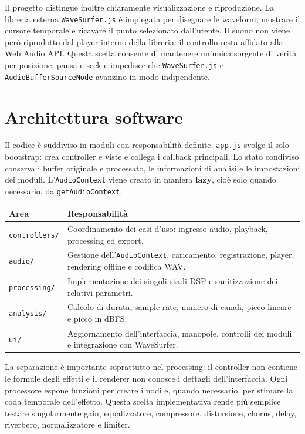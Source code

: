 \documentclass[11pt,a4paper]{article}
\begin{document}
	Il progetto distingue inoltre chiaramente visualizzazione e riproduzione. La libreria esterna \texttt{WaveSurfer.js} è impiegata per disegnare le waveform, mostrare il cursore temporale e ricavare il punto selezionato dall'utente. Il suono non viene però riprodotto dal player interno della libreria: il controllo resta affidato alla Web Audio API. Questa scelta consente di mantenere un'unica sorgente di verità per posizione, pausa e seek e impedisce che \texttt{WaveSurfer.js} e \texttt{AudioBufferSourceNode} avanzino in modo indipendente.
	
	\section{Architettura software}
	
	Il codice è suddiviso in moduli con responsabilità definite. \texttt{app.js} svolge il solo bootstrap: crea controller e viste e collega i callback principali. Lo stato condiviso conserva i buffer originale e processato, le informazioni di analisi e le impostazioni dei moduli.
	L'\texttt{AudioContext} viene creato in maniera \textbf{lazy}, cioè solo quando necessario, da \texttt{getAudioContext}.
	\begin{table}[h]
		\centering
		\small
		\begin{tabularx}{\textwidth}{@{}lX@{}}
			\toprule
			\textbf{Area} & \textbf{Responsabilità} \\
			\midrule
			\texttt{controllers/} & Coordinamento dei casi d'uso: ingresso audio, playback, processing ed export. \\
			\texttt{audio/} & Gestione dell'\texttt{AudioContext}, caricamento, registrazione, player, rendering offline e codifica WAV. \\
			\texttt{processing/} & Implementazione dei singoli stadi DSP e sanitizzazione dei relativi parametri. \\
			\texttt{analysis/} & Calcolo di durata, sample rate, numero di canali, picco lineare e picco in dBFS. \\
			\texttt{ui/} & Aggiornamento dell'interfaccia, manopole, controlli dei moduli e integrazione con WaveSurfer. \\
			\bottomrule
		\end{tabularx}
	\end{table}
	
	La separazione è importante soprattutto nel processing: il controller non contiene le formule degli effetti e il renderer non conosce i dettagli dell'interfaccia. Ogni processore espone funzioni per creare i nodi e, quando necessario, per stimare la coda temporale dell'effetto. Questa scelta implementativa rende più semplice testare singolarmente gain, equalizzatore, compressore, distorsione, chorus, delay, riverbero, normalizzatore e limiter.
	
\end{document}
